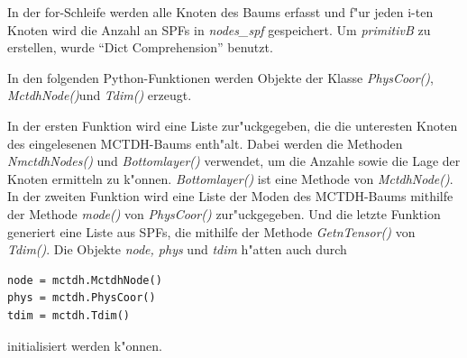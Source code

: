In der for-Schleife werden alle Knoten des Baums erfasst und f"ur jeden i-ten Knoten 
wird die Anzahl an SPFs in \textit{nodes\_spf} gespeichert.
Um \textit{primitivB} zu erstellen, wurde “Dict Comprehension” benutzt.






In den folgenden Python-Funktionen werden Objekte der Klasse \textit{PhysCoor()}, \textit{MctdhNode()}und \textit{Tdim()} erzeugt. 


In der ersten Funktion wird eine Liste zur"uckgegeben, die die unteresten Knoten des eingelesenen MCTDH-Baums enth"alt.
Dabei werden die Methoden \textit{NmctdhNodes()} und \textit{Bottomlayer()} verwendet, um die Anzahle sowie die Lage der Knoten
ermitteln zu k"onnen. \textit{Bottomlayer()} ist eine Methode von \textit{MctdhNode()}.
In der zweiten Funktion wird eine Liste der Moden des MCTDH-Baums mithilfe der Methode \textit{mode()} von \textit{PhysCoor()} zur"uckgegeben. 
Und die letzte Funktion generiert eine Liste aus SPFs, die mithilfe der Methode \textit{GetnTensor()} von \textit{Tdim()}.
Die Objekte \textit{node, phys} und \textit{tdim} h"atten auch durch 

\begin{verbatim}
node = mctdh.MctdhNode()
phys = mctdh.PhysCoor()
tdim = mctdh.Tdim()
\end{verbatim}

initialisiert werden k"onnen. 
    
